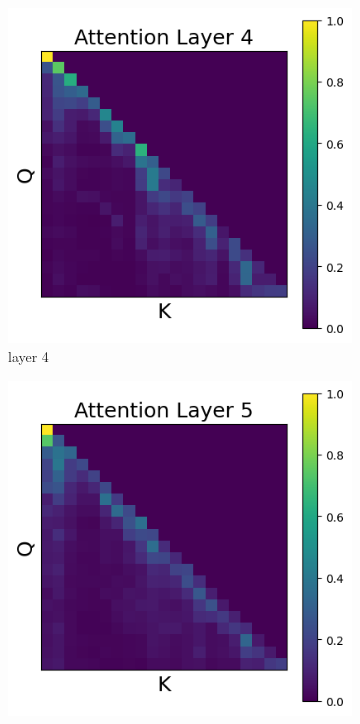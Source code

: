 \documentclass[11pt]{article}
\begin{document}
\begin{figure}[t]
  \begin{subfigure}[t]{0.24\textwidth}
    \centering
    \includegraphics[width=1.4\columnwidth]{figures/intervention2/layer_4.png}
    \caption{layer 4}
    \label{fig:intervention2_layer4}
  \end{subfigure}\hfill
  \begin{subfigure}[t]{0.24\textwidth}
    \centering
    \includegraphics[width=1.4\columnwidth]{figures/intervention2/layer_5.png}

\end{subfigure}
\end{figure}
\end{document}
